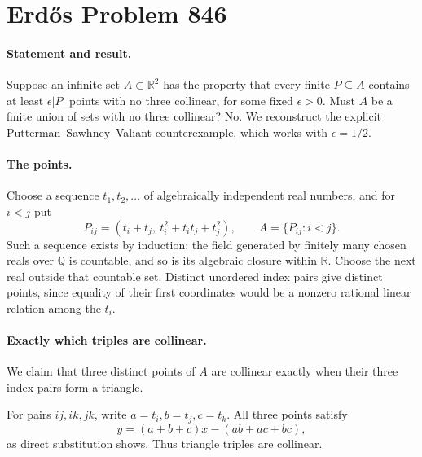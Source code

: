 \section*{Erd\H{o}s Problem 846}

\paragraph{Statement and result.}
Suppose an infinite set \(A\subset\mathbb R^2\) has the property that every finite \(P\subseteq A\) contains at least \(\epsilon|P|\) points with no three collinear, for some fixed \(\epsilon>0\). Must \(A\) be a finite union of sets with no three collinear? No. We reconstruct the explicit Putterman--Sawhney--Valiant counterexample, which works with \(\epsilon=1/2\).

\paragraph{The points.}
Choose a sequence \(t_1,t_2,\ldots\) of algebraically independent real numbers, and for \(i<j\) put
\[
 P_{ij}=(t_i+t_j,\ t_i^2+t_it_j+t_j^2),\qquad
 A=\{P_{ij}:i<j\}.
\]
Such a sequence exists by induction: the field generated by finitely many chosen reals over \(\mathbb Q\) is countable, and so is its algebraic closure within \(\mathbb R\). Choose the next real outside that countable set. Distinct unordered index pairs give distinct points, since equality of their first coordinates would be a nonzero rational linear relation among the \(t_i\).

\paragraph{Exactly which triples are collinear.}
We claim that three distinct points of \(A\) are collinear exactly when their three index pairs form a triangle.

For pairs \(ij,ik,jk\), write \(a=t_i,b=t_j,c=t_k\). All three points satisfy
\[
 y=(a+b+c)x-(ab+ac+bc),
\]
as direct substitution shows. Thus triangle triples are collinear.

